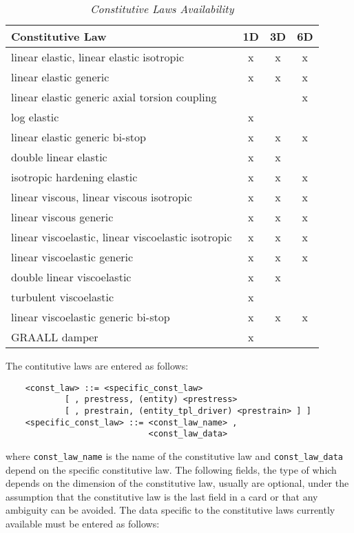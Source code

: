 \begin{table}[h]
    \newlength{\constlawwidth}
    \setlength{\constlawwidth}{70mm}
    \centering
    \caption{\em Constitutive Laws Availability}\label{tab:CONST-LAW-DIM}
    \begin{tabular}{l|c|c|c} 
        \hline
        Constitutive Law & 1D & 3D & 6D \\ 
	\hline
	linear elastic, linear elastic isotropic               & x & x & x \\
	linear elastic generic                                 & x & x & x \\
	linear elastic generic axial torsion coupling          &   &   & x \\
	log elastic                                            & x &   &   \\
	linear elastic generic bi-stop                         & x & x & x \\
	double linear elastic                                  & x & x &   \\
	isotropic hardening elastic                            & x & x & x \\
	linear viscous, linear viscous isotropic               & x & x & x \\
	linear viscous generic                                 & x & x & x \\
	linear viscoelastic, linear viscoelastic isotropic     & x & x & x \\
	linear viscoelastic generic                            & x & x & x \\
	double linear viscoelastic                             & x & x &   \\
	turbulent viscoelastic                                 & x &   &   \\
	linear viscoelastic generic bi-stop                    & x & x & x \\
	GRAALL damper                                          & x &   &   \\
	\hline
    \end{tabular}
\end{table}

\noindent 
The contitutive laws are entered as follows:
\begin{verbatim}
    <const_law> ::= <specific_const_law>                        
            [ , prestress, (entity) <prestress>
            [ , prestrain, (entity_tpl_driver) <prestrain> ] ]
    <specific_const_law> ::= <const_law_name> , 
                             <const_law_data>
\end{verbatim}
where \texttt{const\_law\_name} is the name of the constitutive law and
\texttt{const\_law\_data} depend on the specific constitutive law. 
The following fields, the type of which depends on the dimension of the
constitutive law, usually are optional, under the assumption that the
constitutive law is the last field in a card or that any ambiguity can be
avoided.
The data specific to the constitutive laws currently available must be
entered as follows:


